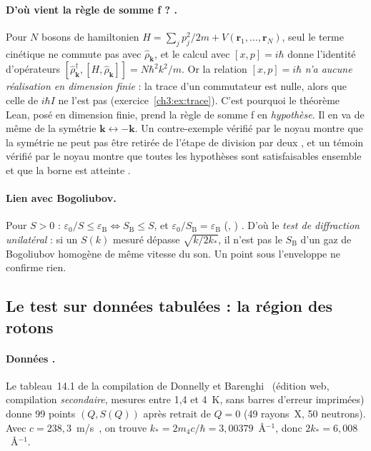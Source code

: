 \paragraph{D'où vient la règle de somme f ? \tierC.} Pour $N$ bosons de hamiltonien
$H=\sum_jp_j^2/2m+V(\mathbf r_1,\dots,\mathbf r_N)$, seul le terme cinétique ne commute pas avec $\hat\rho_{\mathbf k}$, et
le calcul avec $[x,p]=i\hbar$ donne l'identité d'opérateurs $[\hat\rho_{\mathbf k}^\dagger,[H,\hat\rho_{\mathbf k}]]=N\hbar^2k^2/m$.
Or la relation $[x,p]=i\hbar$ \emph{n'a aucune réalisation en dimension finie} : la trace d'un commutateur est nulle,
alors que celle de $i\hbar I$ ne l'est pas (exercice~\ref{ch3:ex:trace}). C'est pourquoi le théorème Lean, posé en
dimension finie, prend la règle de somme f en \emph{hypothèse}. Il en va de même de la symétrie $\mathbf k\leftrightarrow-\mathbf k$.
Un contre-exemple vérifié par le noyau montre que la symétrie ne peut pas être retirée de l'étape de division par deux
\tierAs, et un témoin vérifié par le noyau montre que toutes les hypothèses sont satisfaisables ensemble et que la borne est
atteinte \tierAs.

\paragraph{Lien avec Bogoliubov.} Pour $S>0$ : $\varepsilon_0/S\le\varepsilon_{\mathrm B}\iff S_{\mathrm B}\le S$, et
$\varepsilon_0/S_{\mathrm B}=\varepsilon_{\mathrm B}$ (, ) \tierAs.
D'où le \emph{test de diffraction unilatéral} \tierC : si un $S(k)$ mesuré dépasse $\sqrt{k/2k_*}$, il n'est pas le
$S_{\mathrm B}$ d'un gaz de Bogoliubov homogène de même vitesse du son. Un point sous l'enveloppe ne confirme rien.

\subsection{Le test sur données tabulées : la région des rotons}\label{ch3:sec:roton}
\paragraph{Données \tierL.} Le tableau~14.1 de la compilation de Donnelly et Barenghi~\cite{ch3-db} (édition web,
compilation \emph{secondaire}, mesures entre 1,4 et 4~K, sans barres d'erreur imprimées) donne 99 points $(Q,S(Q))$ après
retrait de $Q=0$ (49 rayons~X, 50 neutrons). Avec $c=238{,}3$~m/s~\cite{ch3-godfrin}, on trouve
$k_*=2m_4c/\hbar=3{,}00379$~\AA$^{-1}$, donc $2k_*=6{,}008$~\AA$^{-1}$.


